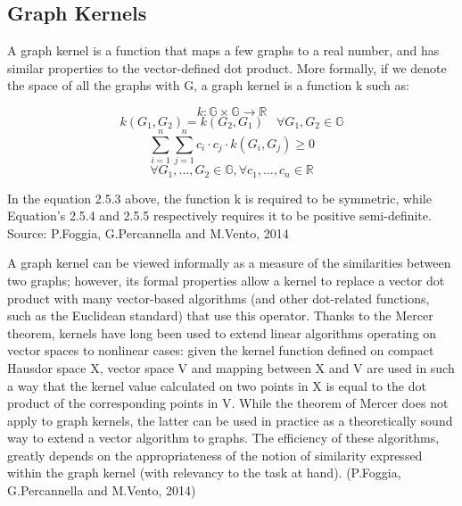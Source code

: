 \subsection{Graph Kernels}
A graph kernel is a function that maps a few graphs to a real number, and has similar properties to the vector-defined dot product. More formally, if we denote the space of all the graphs with G, a graph kernel is a function k such as:

\begin{equation}
k: \mathbb{G} \times \mathbb{G} \longrightarrow \mathbb{R}
\end{equation}
\begin{equation}
k\left(G_{1}, G_{2}\right)=k\left(G_{2}, G_{1}\right) \quad \forall G_{1}, G_{2} \in \mathbb{G}
\end{equation}
\begin{equation}
\sum_{i=1}^{n} \sum_{j=1}^{n} c_{i} \cdot c_{j} \cdot k\left(G_{i}, G_{j}\right) \geq 0
\end{equation}
\begin{equation}
\forall G_{1}, \ldots, G_{2} \in \mathbb{G}, \forall c_{1}, \ldots, c_{n} \in \mathbb{R}
\end{equation}

In the equation 2.5.3 above, the function k is required to be symmetric, while Equation's 2.5.4 and 2.5.5 respectively requires it to be positive semi-definite. Source: P.Foggia, G.Percannella and M.Vento, 2014

A graph kernel can be viewed informally as a measure of the similarities between two graphs; however, its formal properties allow a kernel to replace a vector dot product with many vector-based algorithms (and other dot-related functions, such as the Euclidean standard) that use this operator. Thanks to the Mercer theorem, kernels have long been used to extend linear algorithms operating on vector spaces to nonlinear cases: given the kernel function defined on compact Hausdor space X, vector space V and mapping between X and V are used in such a way that the kernel value calculated on two points in X is equal to the dot product of the corresponding points in V. While the theorem of Mercer does not apply to graph kernels, the latter can be used in practice as a theoretically sound way to extend a vector algorithm to graphs. The efficiency of these algorithms, greatly depends on the appropriateness of the notion of similarity expressed within the graph kernel (with relevancy to the task at hand). (P.Foggia, G.Percannella and M.Vento, 2014)

